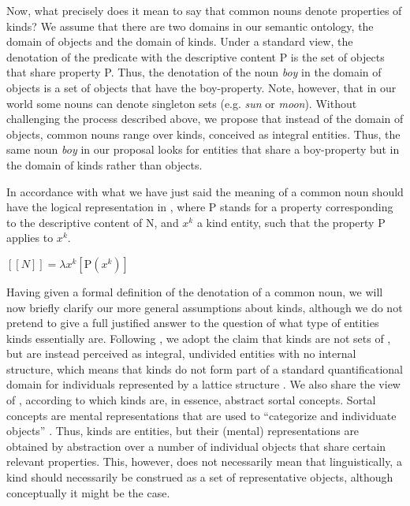 \documentclass[output=paper
,modfonts
,nonflat]{langsci/langscibook}
\begin{document}
	Now, what precisely does it mean to say that common nouns denote properties of kinds? We assume that there are two domains in our semantic ontology, the domain of objects and the domain of kinds. Under a standard view, the denotation of the predicate with the descriptive content P is the set of objects that share property P. Thus, the denotation of the noun \textit{boy} in the domain of objects is a set of objects that have the boy-property. Note, however, that in our world some nouns can denote singleton sets (e.g. \textit{sun} or \textit{moon}). Without challenging the process described above, we propose that instead of the domain of objects, common nouns range over kinds, conceived as integral entities. Thus, the same noun \textit{boy} in our proposal looks for entities that share a boy-property but in the domain of kinds rather than objects. 
	
	In accordance with what we have just said the meaning of a common noun should have the logical representation in , where P stands for a property corresponding to the descriptive content of N, and $x^k$ a kind entity, such that the property P applies to $x^k$.
	
	\ea\label{ex:borik:5}
	$[\![N]\!] = \lambda{x}^k [\mbox{P}(x^k)]$		
	\z					 
	
	Having given a formal definition of the denotation of a common noun, we will now briefly clarify our more general assumptions about kinds, although we do not pretend to give a full justified answer to the question of what type of entities kinds essentially are. Following \citet{Borik2015}, we adopt the claim that kinds are not sets of , but are instead perceived as integral, undivided entities with no internal structure, which means that kinds do not form part of a standard quantificational domain for individuals represented by a lattice structure \citep{Link1983}. We also share the view of \citet{Mueller-Reichau2011}, according to which kinds are, in essence, abstract sortal concepts. Sortal concepts are mental representations that are used to ``categorize and individuate objects'' \citep[21]{Mueller-Reichau2011}. Thus, kinds are entities, but their (mental) representations are obtained by abstraction over a number of individual objects that share certain relevant properties. This, however, does not necessarily mean that linguistically, a kind should necessarily be construed as a set of representative objects, although conceptually it might be the case. 
	
\end{document}
